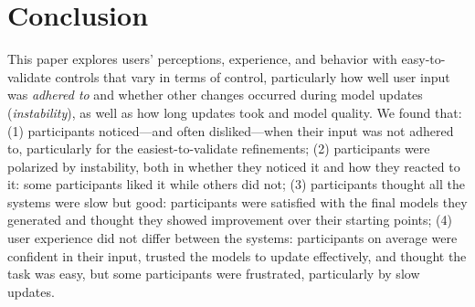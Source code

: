 \section{Conclusion}

This paper explores users' perceptions, experience, and behavior with
easy-to-validate controls that vary in terms of control, particularly
how well user input was \textit{adhered to} and whether other changes
occurred during model updates (\textit{instability}), as well as how
long updates took and model quality.
We found that: (1) participants
noticed---and often disliked---when their input was not adhered to,
particularly for the easiest-to-validate refinements; (2) participants
were polarized by instability, both in whether they noticed it and how
they reacted to it: some participants liked it while others did not;
(3) participants thought all the systems were slow but good:
participants were satisfied with the final models they generated and
thought they showed improvement over their starting points; (4) user
experience did not differ between the systems: participants on average
were confident in their input, trusted the models to update
effectively, and thought the task was easy, but some participants were
frustrated, particularly by slow updates.
